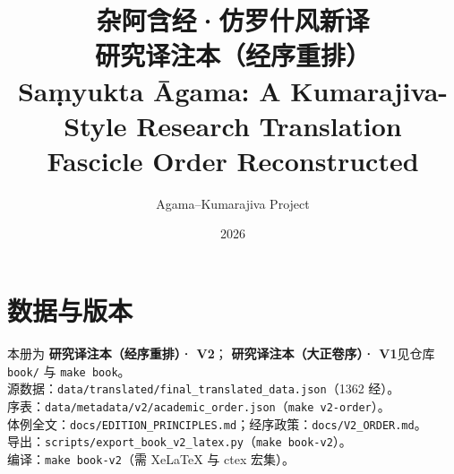 \documentclass[UTF8, zihao=-4, openany, fontset=none]{ctexbook}
\title{\textbf{杂阿含经·仿罗什风新译}\\[0.5em]
\large 研究译注本（经序重排）\\[0.35em]
\normalsize Saṃyukta Āgama: A Kumarajiva-Style Research Translation\\[0.2em]
\normalsize Fascicle Order Reconstructed}
\author{Agama–Kumarajiva Project}
\date{2026}
\begin{document}

\clearpage
{}
\setcounter{page}{1}
\tableofcontents
\clearpage







\mainmatter


\backmatter
\chapter*{数据与版本}
\noindent 本册为 \textbf{研究译注本（经序重排）· V2}；
\textbf{研究译注本（大正卷序）· V1}见仓库 \texttt{book/} 与 \texttt{make book}。\\
源数据：\texttt{data/translated/final\_translated\_data.json}（1362 经）。\\
序表：\texttt{data/metadata/v2/academic\_order.json}（\texttt{make v2-order}）。\\
体例全文：\texttt{docs/EDITION\_PRINCIPLES.md}；经序政策：\texttt{docs/V2\_ORDER.md}。\\
导出：\texttt{scripts/export\_book\_v2\_latex.py}（\texttt{make book-v2}）。\\
编译：\texttt{make book-v2}（需 XeLaTeX 与 ctex 宏集）。
\end{document}
